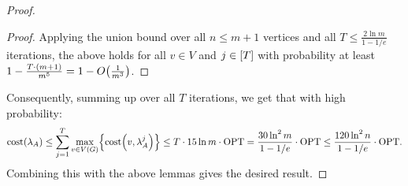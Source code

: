 \begin{proof}
\begin{proof}
Applying the union bound over all $n \leq m + 1$ vertices and all $T \leq \frac{2\ln m}{1-1/e}$ iterations, the above holds for all $v\in V$ and $j\in\mathopen{}\left[ T \right]$ with probability at least $1 - \frac{T\cdot \mathopen{}\left( m+1 \right)}{m^5} = 1 - O\mathopen{}\left( \frac{1}{m^3} \right)$.
\end{proof}
Consequently, summing up over all $T$ iterations, we get that with high probability:
$$\textnormal{cost}\mathopen{}\left( \lambda_A \right) \leq \sum_{j=1}^{T}\max_{v\in V\mathopen{}\left( G \right)}\mathopen{}\left\{ \textnormal{cost}\mathopen{}\left( v, \lambda_A^j \right) \right\} \leq T\cdot 15\ln m\cdot\textnormal{OPT} = \frac{30\ln^2 m}{1-1/e}\cdot\textnormal{OPT}\leq \frac{120\ln^2 n}{1-1/e}\cdot\textnormal{OPT}.$$
Combining this with the above lemmas gives the desired result.
\end{proof}

